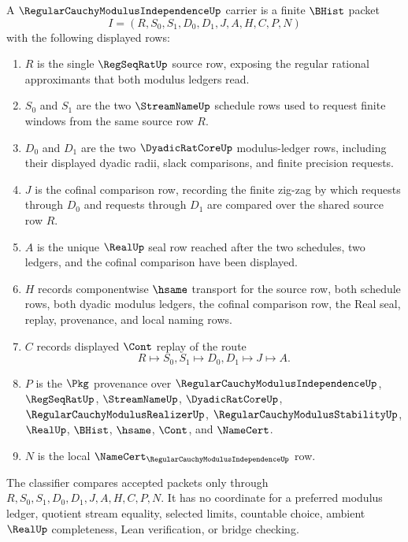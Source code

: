 \begin{definition}
\label{def:regular-cauchy-modulus-independence-carrier}
A $\RegularCauchyModulusIndependenceUp$ carrier is a finite $\BHist$ packet
$$
I=(R,S_0,S_1,D_0,D_1,J,A,H,C,P,N)
$$
with the following displayed rows:
\begin{enumerate}
\item $R$ is the single $\RegSeqRatUp$ source row, exposing the regular rational approximants that both modulus ledgers read.
\item $S_0$ and $S_1$ are the two $\StreamNameUp$ schedule rows used to request finite windows from the same source row $R$.
\item $D_0$ and $D_1$ are the two $\DyadicRatCoreUp$ modulus-ledger rows, including their displayed dyadic radii, slack comparisons, and finite precision requests.
\item $J$ is the cofinal comparison row, recording the finite zig-zag by which requests through $D_0$ and requests through $D_1$ are compared over the shared source row $R$.
\item $A$ is the unique $\RealUp$ seal row reached after the two schedules, two ledgers, and the cofinal comparison have been displayed.
\item $H$ records componentwise $\hsame$ transport for the source row, both schedule rows, both dyadic modulus ledgers, the cofinal comparison row, the Real seal, replay, provenance, and local naming rows.
\item $C$ records displayed $\Cont$ replay of the route
$$
R\longmapsto S_0,S_1\longmapsto D_0,D_1\longmapsto J\longmapsto A .
$$
\item $P$ is the $\Pkg$ provenance over $\RegularCauchyModulusIndependenceUp$, $\RegSeqRatUp$, $\StreamNameUp$, $\DyadicRatCoreUp$, $\RegularCauchyModulusRealizerUp$, $\RegularCauchyModulusStabilityUp$, $\RealUp$, $\BHist$, $\hsame$, $\Cont$, and $\NameCert$.
\item $N$ is the local $\NameCert_{\RegularCauchyModulusIndependenceUp}$ row.
\end{enumerate}
The classifier compares accepted packets only through $R,S_0,S_1,D_0,D_1,J,A,H,C,P,N$. It has no coordinate for a preferred modulus ledger, quotient stream equality, selected limits, countable choice, ambient $\RealUp$ completeness, Lean verification, or bridge checking.
\end{definition}

